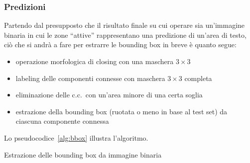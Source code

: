 \subsubsection{Predizioni}
Partendo dal presupposto che il risultato finale su cui operare sia un'immagine binaria in cui le zone ``attive'' rappresentano una predizione di un'area di testo, ciò che si andrà a fare per estrarre le bounding box in breve è quanto segue:
\begin{itemize}
	\item operazione morfologica di closing con una maschera $3\times3$ 
	\item labeling delle componenti connesse con maschera $3\times3$ completa 
	\item eliminazione delle c.c.\ con un'area minore di una certa soglia 
	\item estrazione della bounding box (ruotata o meno in base al test set) da ciascuna componente connessa
\end{itemize}

Lo pseudocodice~\ref{alg:bbox} illustra l'algoritmo.

\begin{algorithm}
\caption{Estrazione delle bounding box da immagine binaria}
\label{alg:bbox}
\begin{algorithmic}
				\EndIf{}
			\EndFor{}
		\EndIf{}
	\EndFunction{}
\end{algorithmic}
\end{algorithm}


